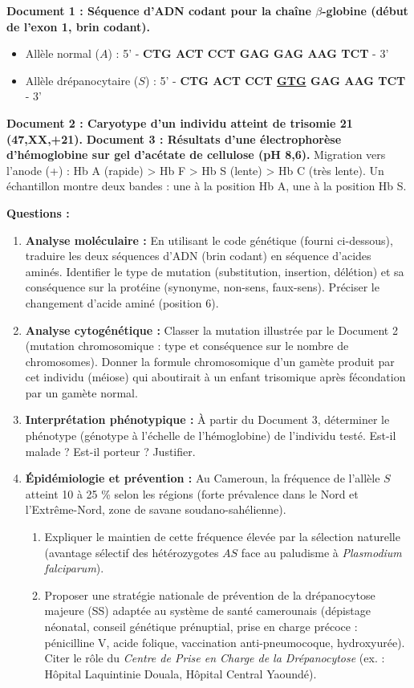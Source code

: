 \documentclass[11pt]{article}
\begin{document}
\begin{exercice}
\textbf{Document 1 : Séquence d'ADN codant pour la chaîne $\beta$-globine (début de l'exon 1, brin codant).}
\begin{itemize}
    \item Allèle normal ($A$) : 5' - \textbf{CTG ACT CCT GAG GAG AAG TCT} - 3'
    \item Allèle drépanocytaire ($S$) : 5' - \textbf{CTG ACT CCT \underline{GTG} GAG AAG TCT} - 3'
\end{itemize}
\textbf{Document 2 : Caryotype d'un individu atteint de trisomie 21 (47,XX,+21).}
\textbf{Document 3 : Résultats d'une électrophorèse d'hémoglobine sur gel d'acétate de cellulose (pH 8,6).}
Migration vers l'anode (+) : Hb A (rapide) > Hb F > Hb S (lente) > Hb C (très lente).
Un échantillon montre deux bandes : une à la position Hb A, une à la position Hb S.

\textbf{Questions :}
\begin{enumerate}
    \item \textbf{Analyse moléculaire :} En utilisant le code génétique (fourni ci-dessous), traduire les deux séquences d'ADN (brin codant) en séquence d'acides aminés. Identifier le type de mutation (substitution, insertion, délétion) et sa conséquence sur la protéine (synonyme, non-sens, faux-sens). Préciser le changement d'acide aminé (position 6).
    \item \textbf{Analyse cytogénétique :} Classer la mutation illustrée par le Document 2 (mutation chromosomique : type et conséquence sur le nombre de chromosomes). Donner la formule chromosomique d'un gamète produit par cet individu (méiose) qui aboutirait à un enfant trisomique après fécondation par un gamète normal.
    \item \textbf{Interprétation phénotypique :} À partir du Document 3, déterminer le phénotype (génotype à l'échelle de l'hémoglobine) de l'individu testé. Est-il malade ? Est-il porteur ? Justifier.
    \item \textbf{Épidémiologie et prévention :} Au Cameroun, la fréquence de l'allèle $S$ atteint 10 à 25 \% selon les régions (forte prévalence dans le Nord et l'Extrême-Nord, zone de savane soudano-sahélienne).
    \begin{enumerate}
        \item Expliquer le maintien de cette fréquence élevée par la sélection naturelle (avantage sélectif des hétérozygotes $AS$ face au paludisme à \emph{Plasmodium falciparum}).
        \item Proposer une stratégie nationale de prévention de la drépanocytose majeure (SS) adaptée au système de santé camerounais (dépistage néonatal, conseil génétique prénuptial, prise en charge précoce : pénicilline V, acide folique, vaccination anti-pneumocoque, hydroxyurée). Citer le rôle du \emph{Centre de Prise en Charge de la Drépanocytose} (ex. : Hôpital Laquintinie Douala, Hôpital Central Yaoundé).
    \end{enumerate}
\end{enumerate}


\end{exercice}
\end{document}
